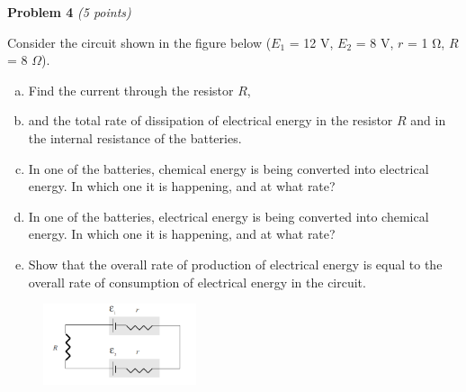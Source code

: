 \documentclass[a4paper, 11pt]{article}
\newenvironment{problem}[3][Problem]
    { \begin{mdframed}[backgroundcolor=gray!20] \textbf{#1 #2} \textit{(#3 points)} }
    {  \end{mdframed}}
\begin{document}
\begin{problem}{4}{5}
\par Consider the circuit shown in the figure below ($E_1$ = 12 V, $E_2$ = 8 V, $r$ = 1 Ω, $R$ = 8 $\Omega$).
\begin{enumerate}[(a)]
	\item Find the current through the resistor $R$,
	\item and the total rate of dissipation of electrical energy in the resistor $R$ and in the internal resistance of the batteries.
	\item In one of the batteries, chemical energy is being converted into electrical energy. In which one it is happening, and at what rate?
	\item In one of the batteries, electrical energy is being converted into chemical energy. In which one it is happening, and at what rate?
	\item Show that the overall rate of production of electrical energy is equal to the overall rate of consumption of electrical energy in the circuit.
\end{enumerate}
\end{problem}
\begin{figure}[!htbp]
	\begin{small}
		\begin{center}
			\includegraphics[width=0.4\textwidth]{hw5_p4_question.png}
		\end{center}
	\end{small}
\end{figure}
\end{document}
